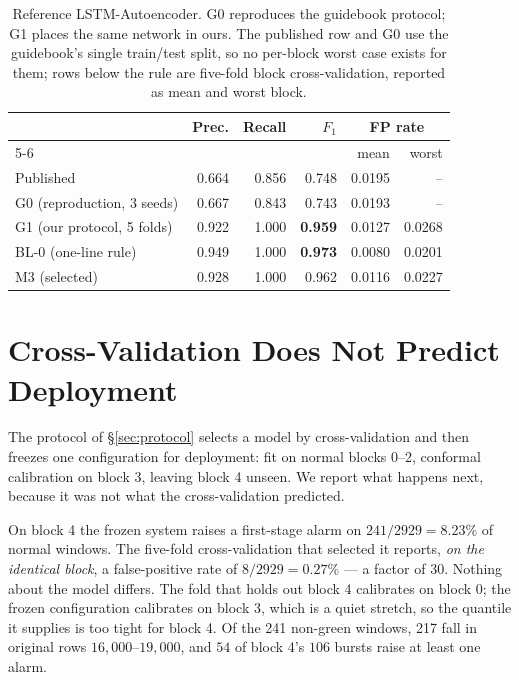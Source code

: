 \documentclass{article}
\begin{document}
\begin{table}[t]
\caption{Reference LSTM-Autoencoder. G0 reproduces the guidebook protocol;
G1 places the same network in ours. The published row and G0 use the
guidebook's single train/test split, so no per-block worst case exists for
them; rows below the rule are five-fold block cross-validation, reported as
mean and worst block.}
\label{tab:bl1}
\vskip 0.08in
\centering
\small
\setlength{\tabcolsep}{4pt}
\begin{tabular}{lrrrrr}
\toprule
 & \multirow{2}{*}{Prec.} & \multirow{2}{*}{Recall} & \multirow{2}{*}{$F_1$}
 & \multicolumn{2}{c}{FP rate} \\
\cmidrule(lr){5-6}
 & & & & mean & worst \\
\midrule
Published \citep{kamp2022press} & 0.664 & 0.856 & 0.748 & 0.0195 & -- \\
G0 (reproduction, 3 seeds)      & 0.667 & 0.843 & 0.743 & 0.0193 & -- \\
\midrule
G1 (our protocol, 5 folds)      & 0.922 & 1.000 & \textbf{0.959} & 0.0127 & 0.0268 \\
BL-0 (one-line rule)            & 0.949 & 1.000 & \textbf{0.973} & 0.0080 & 0.0201 \\
M3 (selected)                   & 0.928 & 1.000 & 0.962 & 0.0116 & 0.0227 \\
\bottomrule
\end{tabular}
\end{table}

\section{Cross-Validation Does Not Predict Deployment}
\label{sec:cvgap}

The protocol of \S\ref{sec:protocol} selects a model by cross-validation and
then freezes one configuration for deployment: fit on normal blocks 0--2,
conformal calibration on block 3, leaving block 4 unseen. We report what
happens next, because it was not what the cross-validation predicted.

On block 4 the frozen system raises a first-stage alarm on
$241/2929 = \mathbf{8.23\%}$ of normal windows. The five-fold cross-validation
that selected it reports, \emph{on the identical block}, a false-positive rate
of $8/2929 = \mathbf{0.27\%}$ --- a factor of $30$. Nothing about the model
differs. The fold that holds out block 4 calibrates on block 0; the frozen
configuration calibrates on block 3, which is a quiet stretch, so the quantile
it supplies is too tight for block 4. Of the 241 non-green windows, 217 fall in
original rows $16{,}000$--$19{,}000$, and $54$ of block 4's $106$ bursts raise
at least one alarm.
\end{document}
